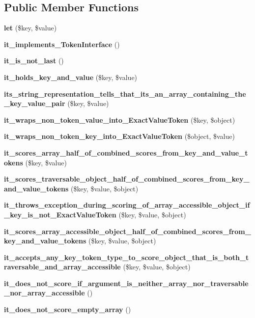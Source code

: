 \subsection*{Public Member Functions}
\begin{DoxyCompactItemize}
\item 
{\bf let} (\$key, \$value)
\item 
{\bf it\+\_\+implements\+\_\+\+Token\+Interface} ()
\item 
{\bf it\+\_\+is\+\_\+not\+\_\+last} ()
\item 
{\bf it\+\_\+holds\+\_\+key\+\_\+and\+\_\+value} (\$key, \$value)
\item 
{\bf its\+\_\+string\+\_\+representation\+\_\+tells\+\_\+that\+\_\+its\+\_\+an\+\_\+array\+\_\+containing\+\_\+the\+\_\+key\+\_\+value\+\_\+pair} (\$key, \$value)
\item 
{\bf it\+\_\+wraps\+\_\+non\+\_\+token\+\_\+value\+\_\+into\+\_\+\+Exact\+Value\+Token} (\$key, \$object)
\item 
{\bf it\+\_\+wraps\+\_\+non\+\_\+token\+\_\+key\+\_\+into\+\_\+\+Exact\+Value\+Token} (\$object, \$value)
\item 
{\bf it\+\_\+scores\+\_\+array\+\_\+half\+\_\+of\+\_\+combined\+\_\+scores\+\_\+from\+\_\+key\+\_\+and\+\_\+value\+\_\+tokens} (\$key, \$value)
\item 
{\bf it\+\_\+scores\+\_\+traversable\+\_\+object\+\_\+half\+\_\+of\+\_\+combined\+\_\+scores\+\_\+from\+\_\+key\+\_\+and\+\_\+value\+\_\+tokens} (\$key, \$value, \$object)
\item 
{\bf it\+\_\+throws\+\_\+exception\+\_\+during\+\_\+scoring\+\_\+of\+\_\+array\+\_\+accessible\+\_\+object\+\_\+if\+\_\+key\+\_\+is\+\_\+not\+\_\+\+Exact\+Value\+Token} (\$key, \$value, \$object)
\item 
{\bf it\+\_\+scores\+\_\+array\+\_\+accessible\+\_\+object\+\_\+half\+\_\+of\+\_\+combined\+\_\+scores\+\_\+from\+\_\+key\+\_\+and\+\_\+value\+\_\+tokens} (\$key, \$value, \$object)
\item 
{\bf it\+\_\+accepts\+\_\+any\+\_\+key\+\_\+token\+\_\+type\+\_\+to\+\_\+score\+\_\+object\+\_\+that\+\_\+is\+\_\+both\+\_\+traversable\+\_\+and\+\_\+array\+\_\+accessible} (\$key, \$value, \$object)
\item 
{\bf it\+\_\+does\+\_\+not\+\_\+score\+\_\+if\+\_\+argument\+\_\+is\+\_\+neither\+\_\+array\+\_\+nor\+\_\+traversable\+\_\+nor\+\_\+array\+\_\+accessible} ()
\item 
{\bf it\+\_\+does\+\_\+not\+\_\+score\+\_\+empty\+\_\+array} ()
\item 

\end{DoxyCompactItemize}
